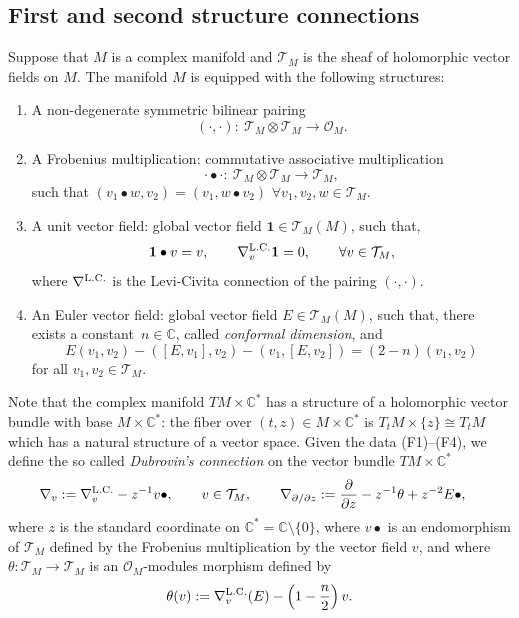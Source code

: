 \documentclass[pdftex]{sigma}
\numberwithin{equation}{section}
\newcommand{\CC}{\mathbb{C}}
\newcommand{\one}{\mathbf{1}}
\newcommand{\T}{\mathcal{T}}
\begin{document}
\subsection{First and second structure connections}
\label{sec:flat_connections}
Suppose that $M$ is a complex manifold and $\mathcal{T}_M$ is the
sheaf of holomorphic vector fields on $M$. The manifold $M$ is
equipped with the following structures:
\begin{enumerate}\itemsep=0pt
\item[(F1)]
 A non-degenerate symmetric bilinear pairing
 \[
 ( \cdot , \cdot )\colon\
 \mathcal{T}_M\otimes \mathcal{T}_M\to \mathcal{O}_M.
 \]
\item[(F2)]
 A Frobenius multiplication: commutative associative multiplication
 \begin{equation*}
 \cdot \bullet \cdot \colon\
 \mathcal{T}_M\otimes \mathcal{T}_M\to \mathcal{T}_M,
 \end{equation*}
 such that $(v_1\bullet w, v_2) = (v_1,w\bullet v_2)$ $\forall
 v_1,v_2,w\in \mathcal{T}_M$.
\item[(F3)]
 A unit vector field: global vector field $\one\in \mathcal{T}_M(M)$, such
 that,
 \begin{equation*}
 \one\bullet v =v,\qquad \nabla^{\rm L. C.}_v \one=0,\qquad \forall v\in \mathcal{T}_M,
 \end{equation*}
 where $\nabla^{\rm L. C.}$ is the Levi-Civita connection of the
 pairing $(\cdot,\cdot)$.
\item[(F4)]
 An Euler vector field: global vector field $E\in \mathcal{T}_M(M)$,
 such that, there exists a constant~${n\in \CC}$, called {\em conformal
 dimension}, and
 \begin{equation*}
 E(v_1,v_2)-([E,v_1],v_2)-(v_1,[E,v_2]) = (2-n) (v_1,v_2)
 \end{equation*}
 for all $v_1,v_2\in \T_M$.
\end{enumerate}
Note that the complex manifold $TM\times \CC^*$ has a structure of a
holomorphic vector bundle with base $M\times \CC^*$: the fiber over
$(t,z)\in M\times \CC^*$ is $T_tM\times \{z\}\cong T_tM$ which has a
natural structure of a vector space. Given the data (F1)--(F4), we
define the so called {\em Dubrovin's connection} on the vector bundle
$TM\times \mathbb{C}^*$
\begin{align*}
 &
 \nabla_v :=
 \nabla^{\rm L.C.}_v -z^{-1} v\bullet,\qquad v\in
 \mathcal{T}_M,
 \qquad
\nabla_{\partial/\partial z} := \frac{\partial}{\partial z} -
 z^{-1}\theta + z^{-2} E\bullet,
\end{align*}
where $z$ is the standard coordinate on
$\mathbb{C}^*=\mathbb{C}\setminus{\{0\}}$, where $v\bullet $ is an
endomorphism of $\mathcal{T}_M$ defined by the Frobenius
multiplication by the vector field $v$, and where $\theta\colon \mathcal{T}_M\to
\mathcal{T}_M$ is an $\mathcal{O}_M$-modules morphism defined by
\begin{equation*}
 \theta(v):=\nabla^{\rm L.C.}_v(E)-\left(1-\frac{n}{2}\right) v.
\end{equation*}
\end{document}
